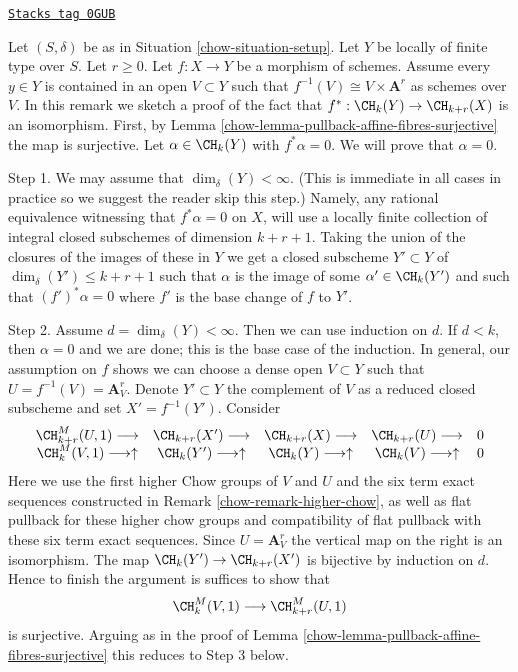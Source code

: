 \begin{remark}
\label{chow-remark-higher-chow-isomorphism}
\href{https://stacks.math.columbia.edu/tag/0GUB}{\texttt{Stacks tag 0GUB}}

Let $(S, \delta)$ be as in Situation \ref{chow-situation-setup}.
Let $Y$ be locally of finite type over $S$. Let $r \geq 0$. Let
$f : X \to Y$ be a morphism of schemes. Assume every $y \in Y$
is contained in an open $V \subset Y$ such that
$f^{-1}(V) \cong V \times \mathbf{A}^r$ as schemes over $V$.
In this remark we sketch a proof of the fact that
$f^* : \CH_k(Y) \to \CH_{k + r}(X)$ is an isomorphism.
First, by Lemma \ref{chow-lemma-pullback-affine-fibres-surjective}
the map is surjective. Let $\alpha \in \CH_k(Y)$ with $f^*\alpha = 0$.
We will prove that $\alpha = 0$.

\medskip\noindent
Step 1. We may assume that $\dim_\delta(Y) < \infty$. (This is immediate
in all cases in practice so we suggest the reader skip this step.)
Namely, any rational equivalence witnessing that $f^*\alpha = 0$ on $X$,
will use a locally finite collection of integral closed subschemes
of dimension $k + r + 1$. Taking the union of the closures of the images
of these in $Y$ we get a closed subscheme $Y' \subset Y$
of $\dim_\delta(Y') \leq k + r + 1$ such that
$\alpha$ is the image of some $\alpha' \in \CH_k(Y')$
and such that $(f')^*\alpha = 0$ where $f'$ is the base change of $f$ to $Y'$.

\medskip\noindent
Step 2. Assume $d = \dim_\delta(Y) < \infty$. Then we can use induction on
$d$. If $d < k$, then $\alpha = 0$ and we are done; this is the base case
of the induction.
In general, our assumption on $f$ shows we can choose a dense open
$V \subset Y$ such that $U = f^{-1}(V) = \mathbf{A}^r_V$.
Denote $Y' \subset Y$ the complement of $V$ as a reduced closed
subscheme and set $X' = f^{-1}(Y')$. Consider
$$
\begin{array}{ccccc}\CH^M_{k + r}(U, 1) \longrightarrow & \CH_{k + r}(X') \longrightarrow & \CH_{k + r}(X) \longrightarrow & \CH_{k + r}(U) \longrightarrow & 0 \\ \CH^M_k(V, 1) \longrightarrow\uparrow & \CH_k(Y') \longrightarrow\uparrow & \CH_k(Y) \longrightarrow\uparrow & \CH_k(V) \longrightarrow\uparrow & 0\end{array}
$$
Here we use the first higher Chow groups of $V$ and $U$ and the
six term exact sequences constructed in Remark \ref{chow-remark-higher-chow},
as well as flat pullback for these higher chow groups and
compatibility of flat pullback with these six term exact sequences.
Since $U = \mathbf{A}^r_V$ the vertical map on the right is an isomorphism.
The map $\CH_k(Y') \to \CH_{k + r}(X')$ is bijective by induction on $d$.
Hence to finish the argument is suffices to show that
$$
\CH^M_k(V, 1) \longrightarrow \CH^M_{k + r}(U, 1)
$$
is surjective. Arguing as in the proof of
Lemma \ref{chow-lemma-pullback-affine-fibres-surjective}
this reduces to Step 3 below.


\end{remark}
